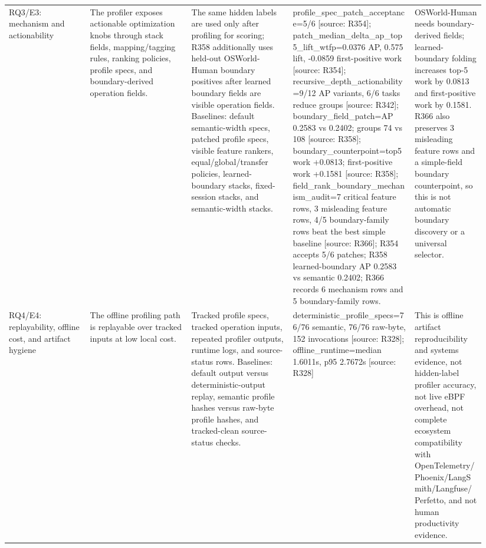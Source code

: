 \begin{tabular}{p{0.16\linewidth}p{0.20\linewidth}p{0.20\linewidth}p{0.24\linewidth}p{0.14\linewidth}}
  RQ3/E3: mechanism and actionability & The profiler exposes actionable optimization knobs through stack fields, mapping/tagging rules, ranking policies, profile specs, and boundary-derived operation fields. & The same hidden labels are used only after profiling for scoring; R358 additionally uses held-out OSWorld-Human boundary positives after learned boundary fields are visible operation fields. Baselines: default semantic-width specs, patched profile specs, visible feature rankers, equal/global/transfer policies, learned-boundary stacks, fixed-session stacks, and semantic-width stacks. & profile\_spec\_patch\_acceptance=5/6 [source: R354]; patch\_median\_delta\_ap\_top5\_lift\_wtfp=0.0376 AP, 0.575 lift, -0.0859 first-positive work [source: R354]; recursive\_depth\_actionability=9/12 AP variants, 6/6 tasks reduce groups [source: R342]; boundary\_field\_patch=AP 0.2583 vs 0.2402; groups 74 vs 108 [source: R358]; boundary\_counterpoint=top5 work +0.0813; first-positive work +0.1581 [source: R358]; field\_rank\_boundary\_mechanism\_audit=7 critical feature rows, 3 misleading feature rows, 4/5 boundary-family rows beat the best simple baseline [source: R366]; R354 accepts 5/6 patches; R358 learned-boundary AP 0.2583 vs semantic 0.2402; R366 records 6 mechanism rows and 5 boundary-family rows. & OSWorld-Human needs boundary-derived fields; learned-boundary folding increases top-5 work by 0.0813 and first-positive work by 0.1581. R366 also preserves 3 misleading feature rows and a simple-field boundary counterpoint, so this is not automatic boundary discovery or a universal selector. \\
  RQ4/E4: replayability, offline cost, and artifact hygiene & The offline profiling path is replayable over tracked inputs at low local cost. & Tracked profile specs, tracked operation inputs, repeated profiler outputs, runtime logs, and source-status rows. Baselines: default output versus deterministic-output replay, semantic profile hashes versus raw-byte profile hashes, and tracked-clean source-status checks. & deterministic\_profile\_specs=76/76 semantic, 76/76 raw-byte, 152 invocations [source: R328]; offline\_runtime=median 1.6011s, p95 2.7672s [source: R328] & This is offline artifact reproducibility and systems evidence, not hidden-label profiler accuracy, not live eBPF overhead, not complete ecosystem compatibility with OpenTelemetry/Phoenix/LangSmith/Langfuse/Perfetto, and not human productivity evidence. \\
  \bottomrule
\end{tabular}
